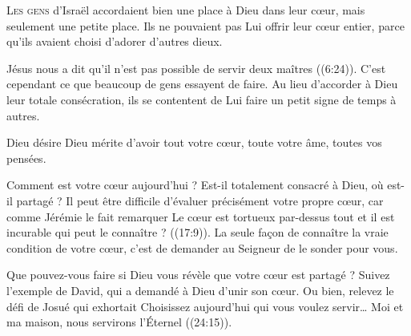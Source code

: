 


\lettrine{L}{es gens} d'Israël accordaient bien une place à Dieu
 dans leur c\oe{}ur, mais seulement une petite place.
 Ils ne pouvaient pas Lui offrir leur c\oe{}ur entier,
 parce qu'ils avaient choisi d'adorer d'autres dieux. 

Jésus nous a dit qu'il n'est pas possible de servir deux maîtres
 ((6:24)).
 C'est cependant ce que beaucoup de gens essayent de faire.
 Au lieu d'accorder à Dieu leur totale consécration,
 ils se contentent de Lui faire un petit signe de temps à autres. 


Dieu désire \ocadr Dieu mérite \fcadr{} d'avoir tout votre c\oe{}ur,
 toute votre âme, toutes vos pensées. 

Comment est votre c\oe{}ur aujourd'hui ? Est-il totalement consacré à Dieu,
 où est-il partagé ? Il peut être difficile d'évaluer précisément
 votre propre c\oe{}ur, car comme Jérémie le fait remarquer\frcolon{}
 \Og Le c\oe{}ur est tortueux par-dessus tout et il est incurable\frcolon{}
 qui peut le connaître ? \Fg{} ((17:9)).
 La seule fa\c{c}on de connaître la vraie condition de votre c\oe{}ur,
 c'est de demander au Seigneur de le sonder pour vous. 

Que pouvez-vous faire si Dieu vous révèle que votre c\oe{}ur est partagé ?
 Suivez l'exemple de David, qui a demandé à Dieu d'unir son c\oe{}ur.
 Ou bien, relevez le défi de Josué qui exhortait\frcolon{} 
 \Og Choisissez aujourd'hui qui vous voulez servir\dots{}
 Moi et ma maison, nous servirons l'Éternel  \Fg{}
 ((24:15)). 

\dvrule






